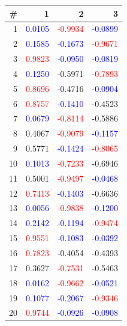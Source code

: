 \begin{tabular}{rrrr}
  \toprule
   \# & 1      & 2       &  3     \\
  \midrule
   1 & \textcolor{blue}{0.0105}& \textcolor{red}{-0.9934} & \textcolor{blue}{-0.0899} \\
   2 & \textcolor{blue}{0.1585}& \textcolor{blue}{-0.1673}& \textcolor{red}{-0.9671} \\
   3 & \textcolor{red}{0.9823} & \textcolor{blue}{-0.0950}& \textcolor{blue}{-0.0819} \\
   4 & \textcolor{blue}{0.1250}& -0.5971                  & \textcolor{red}{-0.7893} \\
   5 & \textcolor{red}{0.8696} & -0.4716                  & \textcolor{blue}{-0.0904} \\
   6 & \textcolor{red}{0.8757} & \textcolor{blue}{-0.1410}& -0.4523 \\
   7 & \textcolor{blue}{0.0679}& \textcolor{red}{-0.8114} & -0.5886 \\
   8 & 0.4067                  & \textcolor{red}{-0.9079} & \textcolor{blue}{-0.1157} \\
   9 & 0.5771                  & \textcolor{blue}{-0.1424}& \textcolor{red}{-0.8065} \\
  10 & \textcolor{blue}{0.1013}& \textcolor{red}{-0.7233} & -0.6946 \\
  11 & 0.5001                  & \textcolor{red}{-0.9497} & \textcolor{blue}{-0.0468} \\
  12 & \textcolor{red}{0.7413} & \textcolor{blue}{-0.1403}& -0.6636 \\
  13 & \textcolor{blue}{0.0056}& \textcolor{red}{-0.9838} & \textcolor{blue}{-0.1200} \\
  14 & \textcolor{blue}{0.2142}& \textcolor{blue}{-0.1194}& \textcolor{red}{-0.9474} \\
  15 & \textcolor{red}{0.9551} & \textcolor{blue}{-0.1083}& \textcolor{blue}{-0.0392} \\
  16 & \textcolor{red}{0.7823} & -0.4054                  & -0.4393 \\
  17 & 0.3627                  & \textcolor{red}{-0.7531} & -0.5463 \\
  18 & \textcolor{blue}{0.0162}& \textcolor{red}{-0.9662} & \textcolor{blue}{-0.0521} \\
  19 & \textcolor{blue}{0.1077}& \textcolor{blue}{-0.2067}& \textcolor{red}{-0.9346} \\
  20 & \textcolor{red}{0.9744} & \textcolor{blue}{-0.0926}& \textcolor{blue}{-0.0908} \\
  \bottomrule
\end{tabular}

